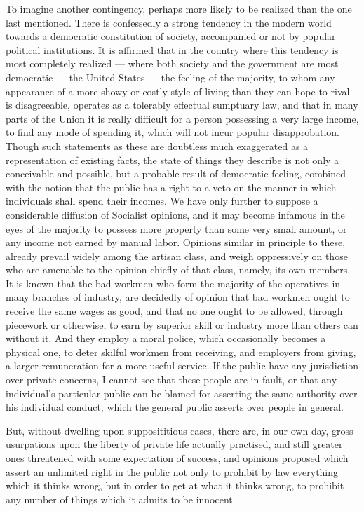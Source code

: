 \documentclass[12pt]{report}
\begin{document}
To imagine another contingency, perhaps more likely to be realized than the one last mentioned. There is confessedly a strong tendency in the modern world towards a democratic constitution of society, accompanied or not by popular political institutions. It is affirmed that in the country where this tendency is most completely realized — where both society and the government are most democratic — the United States — the feeling of the majority, to whom any appearance of a more showy or costly style of living than they can hope to rival is disagreeable, operates as a tolerably effectual sumptuary law, and that in many parts of the Union it is really difficult for a person possessing a very large income, to find any mode of spending it, which will not incur popular disapprobation. Though such statements as these are doubtless much exaggerated as a representation of existing facts, the state of things they describe is not only a conceivable and possible, but a probable result of democratic feeling, combined with the notion that the public has a right to a veto on the manner in which individuals shall spend their incomes. We have only further to suppose a considerable diffusion of Socialist opinions, and it may become infamous in the eyes of the majority to possess more property than some very small amount, or any income not earned by manual labor. Opinions similar in principle to these, already prevail widely among the artisan class, and weigh oppressively on those who are amenable to the opinion chiefly of that class, namely, its own members. It is known that the bad workmen who form the majority of the operatives in many branches of industry, are decidedly of opinion that bad workmen ought to receive the same wages as good, and that no one ought to be allowed, through piecework or otherwise, to earn by superior skill or industry more than others can without it. And they employ a moral police, which occasionally becomes a physical one, to deter skilful workmen from receiving, and employers from giving, a larger remuneration for a more useful service. If the public have any jurisdiction over private concerns, I cannot see that these people are in fault, or that any individual's particular public can be blamed for asserting the same authority over his individual conduct, which the general public asserts over people in general.

But, without dwelling upon supposititious cases, there are, in our own day, gross usurpations upon the liberty of private life actually practised, and still greater ones threatened with some expectation of success, and opinions proposed which assert an unlimited right in the public not only to prohibit by law everything which it thinks wrong, but in order to get at what it thinks wrong, to prohibit any number of things which it admits to be innocent.
\end{document}
